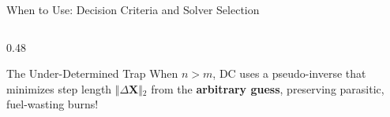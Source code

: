 \documentclass[aspectratio=169, 10pt]{beamer}
\begin{document}
\begin{frame}{When to Use: Decision Criteria and Solver Selection}
\begin{columns}[t]
\begin{column}{0.48\textwidth}
            \vspace{-0.08cm}

            \begin{alertblock}{The Under-Determined Trap}
                \fontsize{5.2pt}{6.2pt}\selectfont
                When $n > m$, DC uses a pseudo-inverse that minimizes step length $\Vert{}\Delta \mathbf{X}\Vert{}_2$ from the \textbf{arbitrary guess}, preserving parasitic, fuel-wasting burns!
            \end{alertblock}
        \end{column}
    \end{columns}
\end{frame}

\end{document}
